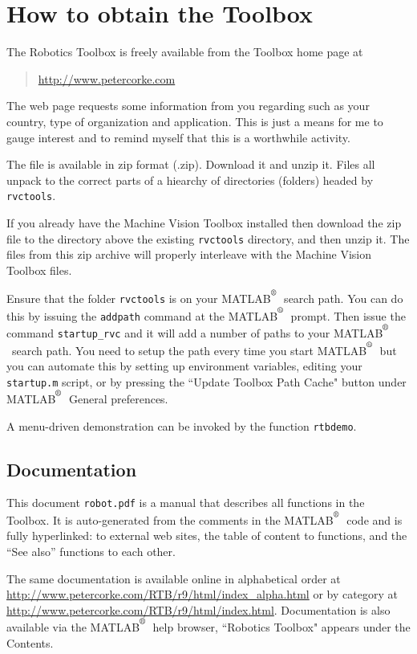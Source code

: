 \documentclass[a4paper]{report}
\def\Mlab{MATLAB$^{\textsuperscript{\textregistered}}$}
\begin{document}
\section{How to obtain the Toolbox}
The Robotics Toolbox is freely available from the Toolbox home
page at 
\begin{quote}
\url{http://www.petercorke.com}
\end{quote}

The web page requests some information from you
regarding such as your country, type of organization and application.
This is just a means for me to gauge interest and to remind myself
that this is a worthwhile activity.

The file is available in zip format (.zip).  Download it and unzip it.
Files all unpack to the correct parts of a hiearchy of directories (folders)
headed by \texttt{rvctools}.

If you already have the Machine Vision Toolbox installed then download
the zip file to the directory above the existing \texttt{rvctools} directory,
and then unzip it.
The files from this zip archive will properly interleave with the Machine
Vision Toolbox files.

Ensure that the folder \texttt{rvctools} is on your \Mlab\ search
path.  You can do this by issuing the \texttt{addpath} command at 
the \Mlab\ prompt.
Then issue the command \texttt{startup\_rvc} and it will add a number
of paths to your \Mlab\ search path.
You need to setup the path every time you start \Mlab\ but you can 
automate this by setting up environment variables, editing your 
\texttt{startup.m} script, or by pressing the ``Update Toolbox Path
Cache" button under \Mlab\ General preferences.

A menu-driven demonstration can be invoked by the function {\tt rtbdemo}.

\subsection{Documentation}
This document {\tt robot.pdf} is a manual that describes all functions in the Toolbox.
It is auto-generated from the comments in the \Mlab\ code and is fully hyperlinked:
to external web sites, the table of content to functions, and the ``See also'' functions
to each other.

The same documentation is available online in
alphabetical order at \url{http://www.petercorke.com/RTB/r9/html/index_alpha.html}
or by category at \url{http://www.petercorke.com/RTB/r9/html/index.html}.
Documentation is also available via the \Mlab\ help browser, ``Robotics
Toolbox" appears under the Contents.
\end{document}
